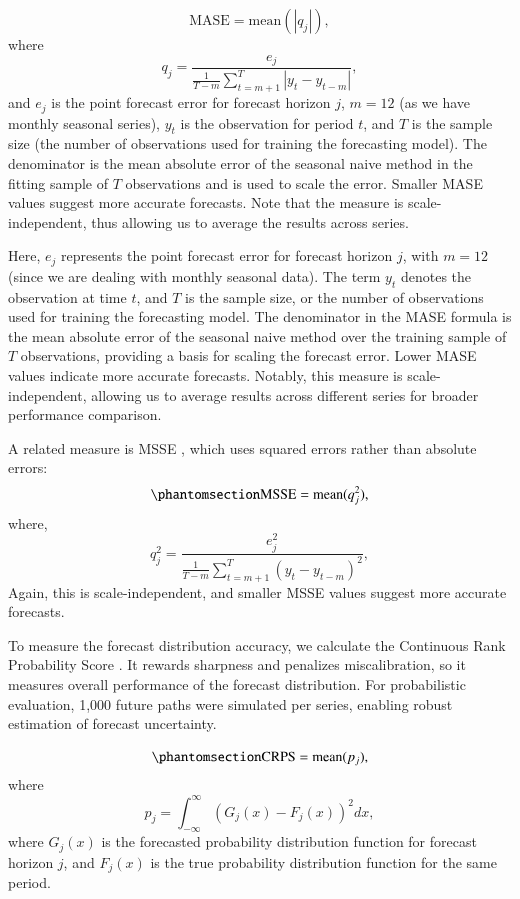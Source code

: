 \documentclass[
  authoryear,
  preprint,
  3p]{elsarticle}
\begin{document}
\[
  \text{MASE} = \text{mean}(|q_{j}|),
\] where \[
  q_{j} = \frac{ e_{j}}
 {\displaystyle\frac{1}{T-m}\sum_{t=m+1}^T |y_{t}-y_{t-m}|},
\] and \(e_{j}\) is the point forecast error for forecast horizon \(j\),
\(m = 12\) (as we have monthly seasonal series), \(y_t\) is the
observation for period \(t\), and \(T\) is the sample size (the number
of observations used for training the forecasting model). The
denominator is the mean absolute error of the seasonal naive method in
the fitting sample of \(T\) observations and is used to scale the error.
Smaller MASE values suggest more accurate forecasts. Note that the
measure is scale-independent, thus allowing us to average the results
across series.

Here, \(e_{j}\) represents the point forecast error for forecast horizon
\(j\), with \(m = 12\) (since we are dealing with monthly seasonal
data). The term \(y_t\) denotes the observation at time \(t\), and \(T\)
is the sample size, or the number of observations used for training the
forecasting model. The denominator in the MASE formula is the mean
absolute error of the seasonal naive method over the training sample of
\(T\) observations, providing a basis for scaling the forecast error.
Lower MASE values indicate more accurate forecasts. Notably, this
measure is scale-independent, allowing us to average results across
different series for broader performance comparison.

A related measure is MSSE
\citep{hyndman2021forecasting, makridakis2022m5}, which uses squared
errors rather than absolute errors:
\begin{equation}\phantomsection\label{eq-RMSSE}{
  \text{MSSE} = \text{mean}(q_{j}^2),
}\end{equation} where, \[
  q^2_{j} = \frac{ e^2_{j}}
 {\displaystyle\frac{1}{T-m}\sum_{t=m+1}^T (y_{t}-y_{t-m})^2},
\] Again, this is scale-independent, and smaller MSSE values suggest
more accurate forecasts.

To measure the forecast distribution accuracy, we calculate the
Continuous Rank Probability Score \citep{hyndman2021forecasting}. It
rewards sharpness and penalizes miscalibration, so it measures overall
performance of the forecast distribution. For probabilistic evaluation,
1,000 future paths were simulated per series, enabling robust estimation
of forecast uncertainty.

\begin{equation}\phantomsection\label{eq-CRPS}{
  \text{CRPS} = \text{mean}(p_j),
}\end{equation} where \[
  p_j = \int_{-\infty}^{\infty} \left(G_j(x) - F_j(x)\right)^2dx,
\] where \(G_j(x)\) is the forecasted probability distribution function
for forecast horizon \(j\), and \(F_j(x)\) is the true probability
distribution function for the same period.
\end{document}
